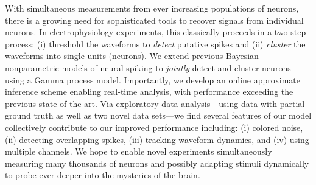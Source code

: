 
With simultaneous measurements from ever increasing populations of neurons, %
there is a growing need for sophisticated tools to recover signals from individual neurons.  In electrophysiology experiments, this classically proceeds in 
a two-step process: (i) threshold the waveforms to \emph{detect} putative spikes and (ii) \emph{cluster} the waveforms into single units (neurons).  
We extend previous Bayesian nonparametric models of neural spiking to \emph{jointly} detect and cluster neurons using a Gamma process model.  
Importantly, we develop an online approximate inference scheme enabling real-time analysis, with performance exceeding the previous state-of-the-art. 
Via exploratory data analysis---using data with partial ground truth as well as two novel data sets---we find several features of our model collectively contribute to our improved performance including: 
(i) colored noise, (ii) detecting overlapping spikes, (iii) tracking waveform dynamics, and (iv) using multiple channels.  
We hope to enable novel experiments simultaneously measuring many thousands of neurons and possibly adapting stimuli dynamically to probe ever deeper into the mysteries of the brain.
 
